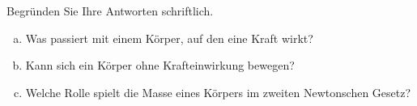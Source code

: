 
\begin{aufgabe}
	Begründen Sie Ihre Antworten schriftlich.
	\begin{enumerate} [a)]
		\item Was passiert mit einem Körper, auf den eine Kraft wirkt?
		\item Kann sich ein Körper ohne Krafteinwirkung bewegen?
		\item Welche Rolle spielt die Masse eines Körpers im zweiten Newtonschen Gesetz?
	\end{enumerate}
\end{aufgabe}
